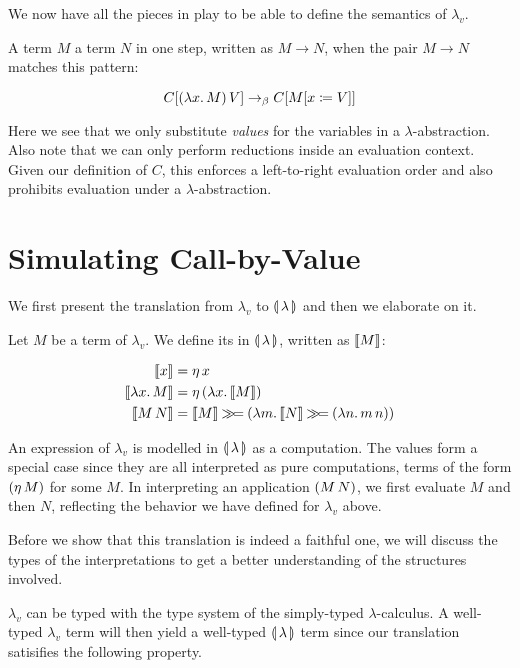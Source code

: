 We now have all the pieces in play to be able to define the semantics of
$\lambda_v$.

\begin{definition}
  A term $M$  a term $N$ in one step, written as $M \to
  N$, when the pair $M \to N$ matches this pattern:

$$
C[(\lambda x.\, M)\,V] \to_\beta C[M[x \coloneqq V]]
$$
\end{definition}

Here we see that we only substitute \emph{values} for the variables in a
$\lambda$-abstraction. Also note that we can only perform reductions inside
an evaluation context. Given our definition of $C$, this enforces a
left-to-right evaluation order and also prohibits evaluation under a
$\lambda$-abstraction.


\section{Simulating Call-by-Value}
\label{ssec:simulating-cbv}

We first present the translation from $\lambda_v$ to $\llparenthesis \, \lambda \, \rrparenthesis$ and
then we elaborate on it.

\begin{definition}
  Let $M$ be a term of $\lambda_v$. We define its  in
  $\llparenthesis \, \lambda \, \rrparenthesis$, written as $\llbracket M \rrbracket$:

\begin{align*}
  \llbracket x \rrbracket &= \eta\,x \\
  \llbracket \lambda x.\, M \rrbracket &= \eta\,(\lambda x.\, \llbracket M \rrbracket) \\
  \llbracket M\,N \rrbracket &= \llbracket M \rrbracket \mathbin{\gg\!=} (\lambda m.\, \llbracket N \rrbracket \mathbin{\gg\!=} (\lambda n.\, m\,n))
\end{align*}
\end{definition}

An expression of $\lambda_v$ is modelled in $\llparenthesis \, \lambda \, \rrparenthesis$ as a
computation. The values form a special case since they are all interpreted
as pure computations, terms of the form $(\eta\,M)$ for some $M$. In
interpreting an application $(M\,N)$, we first evaluate $M$ and then
$N$, reflecting the behavior we have defined for $\lambda_v$ above.

Before we show that this translation is indeed a faithful one, we will
discuss the types of the interpretations to get a better understanding of
the structures involved.

$\lambda_v$ can be typed with the type system of the simply-typed
$\lambda$-calculus. A well-typed $\lambda_v$ term will then yield a
well-typed $\llparenthesis \, \lambda \, \rrparenthesis$ term since our translation satisifies the
following property. 

